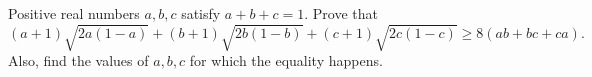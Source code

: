 Positive real numbers $a,b,c$ satisfy $a+b+c=1$. Prove that
$$(a+1)\sqrt{2a(1-a)}  + (b+1)\sqrt{2b(1-b)}  + (c+1)\sqrt{2c(1-c)}  \geq 8(ab+bc+ca).$$Also, find the values of $a,b,c$ for which the equality happens.